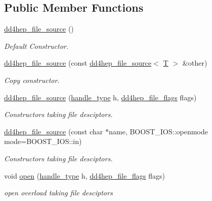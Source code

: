 \subsection*{Public Member Functions}
\begin{DoxyCompactItemize}
\item 
\hyperlink{class_d_d4hep_1_1dd4hep__file__source_a030d8a2563b52d4ea5f206e2d1dbaef5}{dd4hep\+\_\+file\+\_\+source} ()
\begin{DoxyCompactList}\small\item\em Default Constructor. \end{DoxyCompactList}\item 
\hyperlink{class_d_d4hep_1_1dd4hep__file__source_a0f0b058ced88e3e25a3f5ec615ce234b}{dd4hep\+\_\+file\+\_\+source} (const \hyperlink{class_d_d4hep_1_1dd4hep__file__source}{dd4hep\+\_\+file\+\_\+source}$<$ \hyperlink{class_t}{T} $>$ \&other)
\begin{DoxyCompactList}\small\item\em Copy constructor. \end{DoxyCompactList}\item 
\hyperlink{class_d_d4hep_1_1dd4hep__file__source_a66badf1d47206c7d61e0e036e910999e}{dd4hep\+\_\+file\+\_\+source} (\hyperlink{class_d_d4hep_1_1dd4hep__file_a4d79f8d433cd7831ff818691424cd6fc}{handle\+\_\+type} h, \hyperlink{namespace_d_d4hep_a31d19f9b0ce567067d2897fbda1761e5}{dd4hep\+\_\+file\+\_\+flags} flags)
\begin{DoxyCompactList}\small\item\em Constructors taking file desciptors. \end{DoxyCompactList}\item 
\hyperlink{class_d_d4hep_1_1dd4hep__file__source_a84e465929a469a23c8347adf98f68afe}{dd4hep\+\_\+file\+\_\+source} (const char $\ast$name, B\+O\+O\+S\+T\+\_\+\+I\+O\+S\+::openmode mode=B\+O\+O\+S\+T\+\_\+\+I\+O\+S\+::in)
\begin{DoxyCompactList}\small\item\em Constructors taking file desciptors. \end{DoxyCompactList}\item 
void \hyperlink{class_d_d4hep_1_1dd4hep__file__source_a367c212f20de3cfe79b5e69403a5a256}{open} (\hyperlink{class_d_d4hep_1_1dd4hep__file_a4d79f8d433cd7831ff818691424cd6fc}{handle\+\_\+type} h, \hyperlink{namespace_d_d4hep_a31d19f9b0ce567067d2897fbda1761e5}{dd4hep\+\_\+file\+\_\+flags} flags)
\begin{DoxyCompactList}\small\item\em open overload taking file desciptors \end{DoxyCompactList}\item 

\end{DoxyCompactItemize}

